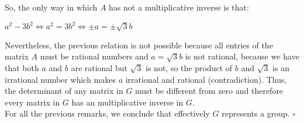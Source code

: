 \documentclass[a4paper,openany,11pt]{book}
\begin{document}
So, the only way in which $A$ has not a multiplicative inverse is that:

\begin{center}
	$a^{2}-3b^{2} \iff a^{2} = 3b^{2} \iff \pm a = \pm \sqrt{3}b$
\end{center}

Nevertheless, the previous relation is not possible because all entries of the matrix $A$ must be rational numbers and $a = \sqrt{3}b$ is not rational, because we have that both $a$ and $b$ are rational but $\sqrt{3}$ is not, so the product of $b$ and $\sqrt{3}$ is an irrational number which makes $a$ irrational and rational (contradiction). Thus, the determinant of any matrix in $G$ must be different from zero and therefore every matrix in $G$ has an multiplicative inverse in $G$.\\

For all the previous remarks, we conclude that effectively $G$ represents a group. \hspace{0.1cm} $\square$ 
\end{document}
